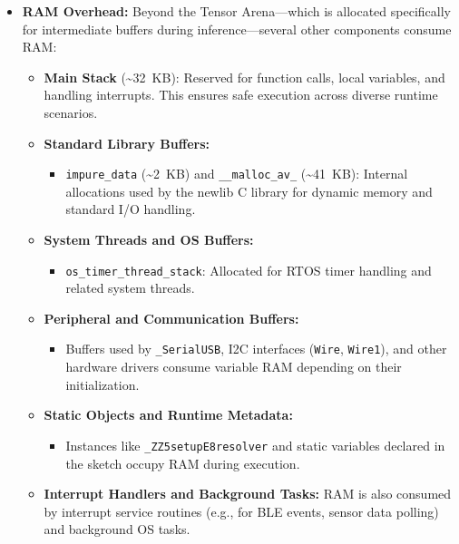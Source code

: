 \begin{itemize}
    \item \textbf{RAM Overhead:} Beyond the Tensor Arena—which is allocated specifically for intermediate buffers during inference—several other components consume RAM:
    \begin{itemize}
        \item \textbf{Main Stack} (\textasciitilde32~KB): Reserved for function calls, local variables, and handling interrupts. This ensures safe execution across diverse runtime scenarios.
        \item \textbf{Standard Library Buffers:}
        \begin{itemize}
            \item \texttt{impure\_data} (\textasciitilde2~KB) and \texttt{\_\_malloc\_av\_} (\textasciitilde41~KB): Internal allocations used by the newlib C library for dynamic memory and standard I/O handling.
        \end{itemize}
        \item \textbf{System Threads and OS Buffers:}
        \begin{itemize}
            \item \texttt{os\_timer\_thread\_stack}: Allocated for RTOS timer handling and related system threads.
        \end{itemize}
        \item \textbf{Peripheral and Communication Buffers:}
        \begin{itemize}
            \item Buffers used by \texttt{\_SerialUSB}, I2C interfaces (\texttt{Wire}, \texttt{Wire1}), and other hardware drivers consume variable RAM depending on their initialization.
        \end{itemize}
        \item \textbf{Static Objects and Runtime Metadata:}
        \begin{itemize}
            \item Instances like \texttt{\_ZZ5setupE8resolver} and static variables declared in the sketch occupy RAM during execution.
        \end{itemize}
        \item \textbf{Interrupt Handlers and Background Tasks:} RAM is also consumed by interrupt service routines (e.g., for BLE events, sensor data polling) and background OS tasks.
    \end{itemize}
\end{itemize}


